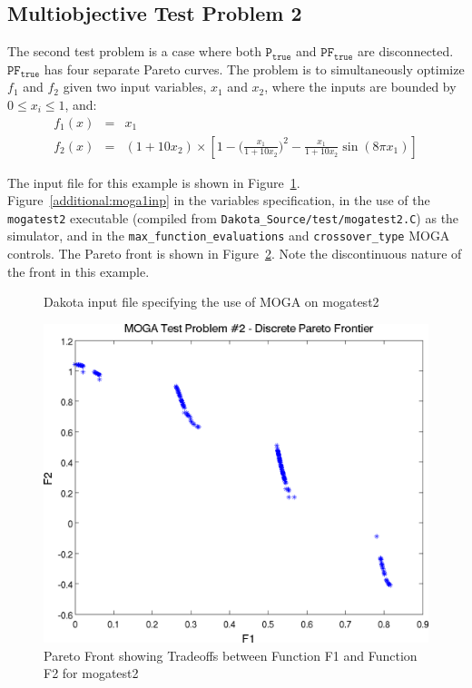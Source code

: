 \subsection{Multiobjective Test Problem 2}\label{additional:multiobjective:problem2}

The second test problem is a case where both $\mathtt{P_{true}}$ and
$\mathtt{PF_{true}}$ are disconnected. $\mathtt{PF_{true}}$ has four
separate Pareto curves. The problem is to simultaneously optimize
$f_1$ and $f_2$ given two input variables, $x_1$ and $x_2$,
where the inputs are bounded by $0 \leq x_{i} \leq 1$, and:
\begin{eqnarray*}
f_1(x) &=& x_1 \\
f_2(x) &=& (1+10x_2) \times \left[1-\bigg(\frac{x_1}{1+10x_2}\bigg)^2-
\frac{x_1}{1+10x_2}\sin(8\pi x_1)\right]
\end{eqnarray*}

The input file for this example is shown in
Figure~\ref{additional:moga2inp}.
Figure~\ref{additional:moga1inp} in the variables specification, in
the use of the \texttt{mogatest2} executable (compiled from
\texttt{Dakota\_Source/test/mogatest2.C}) as the simulator, and in the
\texttt{max\_function\_evaluations} and \texttt{crossover\_type} MOGA
controls. The Pareto front is shown in
Figure~\ref{additional:moga2front}. Note the discontinuous nature of
the front in this example.

\begin{figure}
  \centering
  \begin{bigbox}
    \begin{small}
    \end{small}
  \end{bigbox}
  \caption{Dakota input file specifying the use of MOGA on mogatest2}
  \label{additional:moga2inp}
\end{figure}

\begin{figure}
  \centering
  \includegraphics[scale=0.75]{images/dakota_mogatest2_pareto_front}
  \caption{Pareto Front showing Tradeoffs between Function F1 and
    Function F2 for mogatest2}
  \label{additional:moga2front}
\end{figure}

